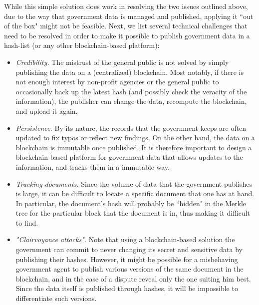 While this simple solution does work in resolving the two issues outlined above, due to the way that government data is managed and published, applying it ``out of the box" might not be feasible. Next, we list several technical challenges that need to be resolved in order to make it possible to publish government data in a hash-list (or any other blockchain-based platform):
\begin{itemize}
\item {\it Credibility.} The mistrust of the general public is not solved by simply publishing the data on a (centralized) blockchain. Most notably, if there is not enough interest by non-profit agencies or the general public to occasionally back up the latest hash (and possibly check the veracity of the information), the publisher can change the data, recompute the blockchain, and upload it again. %
\item {\it Persistence.} By its nature, the records that the government keeps are often updated to fix typos or reflect new findings. On the other hand, the data on a blockchain is immutable once published. It is therefore important to design a blockchain-based platform for government data that allows updates to the information, and tracks them in a immutable way.
\item {\it Tracking documents.} Since the volume of data that the government publishes is large, it can be difficult to locate a specific document that one has at hand. In particular, the document's hash will probably be ``hidden" in the Merkle tree for the particular block that the document is in, thus making it difficult to find.%
\item {\it "Clairvoyance attacks".} Note that using a blockchain-based solution the government can commit to never changing its secret and sensitive data by publishing their hashes. However, it might be possible for a misbehaving government agent to publish various versions of the same document in the blockchain, and in the case of a dispute reveal only the one suiting him best. Since the data itself is published through hashes, it will be impossible to differentiate such versions.
\end{itemize}

